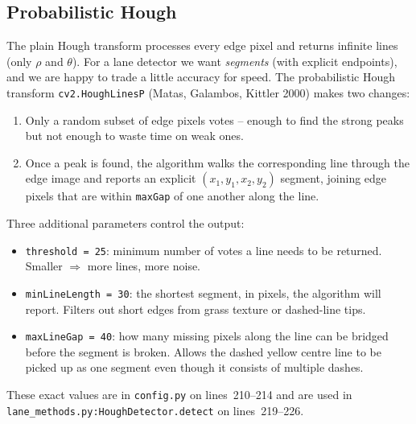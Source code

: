 \subsection{Probabilistic Hough}

The plain Hough transform processes every edge pixel and returns
infinite lines (only $\rho$ and $\theta$). For a lane detector we want
\emph{segments} (with explicit endpoints), and we are happy to trade a
little accuracy for speed. The probabilistic Hough transform
\texttt{cv2.HoughLinesP} (Matas, Galambos, Kittler 2000) makes two
changes:
\begin{enumerate}[leftmargin=1.6em,itemsep=2pt]
  \item Only a random subset of edge pixels votes -- enough to find
        the strong peaks but not enough to waste time on weak ones.
  \item Once a peak is found, the algorithm walks the corresponding
        line through the edge image and reports an explicit
        $(x_1,y_1,x_2,y_2)$ segment, joining edge pixels that are
        within \texttt{maxGap} of one another along the line.
\end{enumerate}
Three additional parameters control the output:
\begin{itemize}[leftmargin=1.4em,itemsep=2pt]
  \item \texttt{threshold = 25}: minimum number of votes a line needs
        to be returned. Smaller $\Rightarrow$ more lines, more noise.
  \item \texttt{minLineLength = 30}: the shortest segment, in pixels,
        the algorithm will report. Filters out short edges from grass
        texture or dashed-line tips.
  \item \texttt{maxLineGap = 40}: how many missing pixels along the
        line can be bridged before the segment is broken. Allows the
        dashed yellow centre line to be picked up as one segment even
        though it consists of multiple dashes.
\end{itemize}
These exact values are in \texttt{config.py} on lines~210--214 and are
used in \texttt{lane\_methods.py:HoughDetector.detect} on
lines~219--226.

